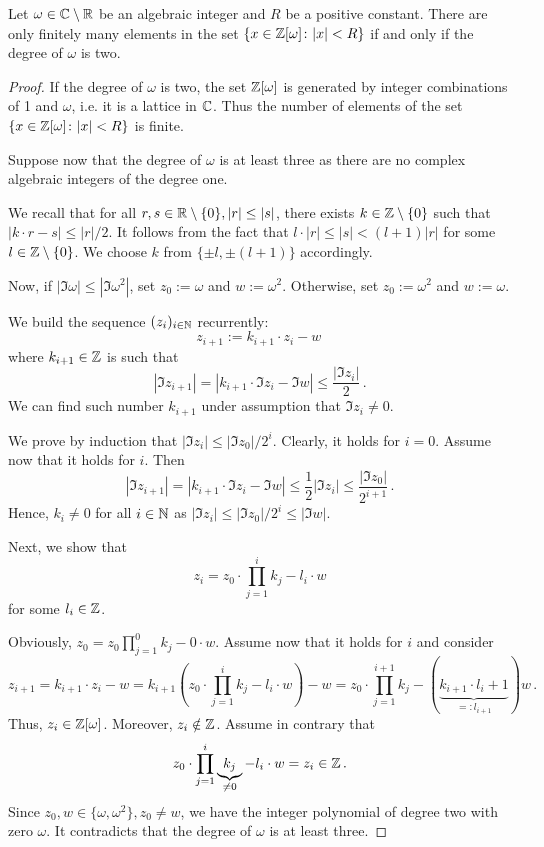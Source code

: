\begin{lem}
\label{lem:numElemCC}
Let $\omega\in \mathbb{C}\setminus\mathbb{R}$ be an algebraic integer and $R$ be a positive constant. There are only finitely many elements in the set $\left\{x \in\mathbb{Z}[\omega] \colon |x|<R\right\}$ if and only if the degree of $\omega$ is two.  
\end{lem}
\begin{proof}
If the degree of $\omega$ is two, the set $\mathbb{Z}[\omega]$ is generated by integer combinations of 1 and $\omega$, i.e. it is a lattice in $\mathbb{C}$. Thus the number of elements of the set $\left\{x \in\mathbb{Z}[\omega] \colon |x|<R\right\}$ is finite.

Suppose now that the degree of $\omega$ is at least three as there are no complex algebraic integers of the degree one. 


We recall that for all $r,s\in\mathbb{R}\setminus\{0\}, |r|\leq|s|$, there exists $k\in\mathbb{Z}\setminus\{0\}$ such that $|k\cdot r -s|\leq |r|/2$. It follows from the fact that $l\cdot |r| \leq |s| <(l+1)|r| $ for some $l\in\mathbb{Z}\setminus\{0\}$. We choose $k$ from $\{\pm l,\pm(l+1)\}$ accordingly. 
 
Now, if $|\Im \omega|\leq|\Im \omega^2|$, set $z_0:=\omega$ and $w:=\omega^2$. Otherwise, set $z_0:=\omega^2$ and $w:=\omega$.   

We build the sequence $(z_i)_{i\in\mathbb{N}}$ recurrently:
$$
z_{i+1}:=k_{i+1} \cdot z_{i}-w\, 
$$
where $k_{i+1}\in\mathbb{Z}$ is such that 
$$
|\Im z_{i+1}|=|k_{i+1} \cdot\Im z_{i}-\Im w|\leq \frac{|\Im z_{i}|}{2}\,.
$$
We can find such number $k_{i+1}$ under assumption that $\Im z_{i} \neq 0$.

We prove by induction that $|\Im z_i|\leq |\Im z_0|/2^i$. Clearly, it holds for $i=0$. Assume now that it holds for $i$. Then 
$$
|\Im z_{i+1}|= |k_{i+1} \cdot \Im z_{i}- \Im w|\leq \frac{1}{2}|\Im z_i|\leq \frac{|\Im z_0|}{2^{i+1}}\,. 
$$
Hence, $k_i\neq 0$ for all $i\in\mathbb{N}$ as $|\Im z_i|\leq |\Im z_0|/2^i \leq |\Im w|$.

Next, we show that
$$
z_i=z_0 \cdot \prod_{j=1}^i k_j- l_i\cdot w
$$
for some $l_i\in\mathbb{Z}$. 

Obviously, $z_0=z_0 \prod_{j=1}^0 k_j - 0\cdot w$. Assume now that it holds for $i$ and consider
$$
z_{i+1}=k_{i+1} \cdot z_{i}-w= k_{i+1}\left(z_0 \cdot \prod_{j=1}^i k_j- l_i\cdot w\right) -w=z_0 \cdot \prod_{j=1}^{i+1} k_j - (\underbrace{k_{i+1}\cdot l_i +1}_{=:l_{i+1}})w\,.
$$
Thus, $z_i\in\mathbb{Z}[\omega]$. Moreover, $z_i\notin \mathbb{Z}$. Assume in contrary that 
$$
z_0 \cdot \prod_{j=1}^i \underbrace{k_j}_{\neq0}- l_i\cdot w = z_i\in \mathbb{Z}\,.
$$
Since $z_0,w\in\{\omega, \omega^2\}, z_0\neq w$, we have the integer polynomial of degree two with zero $\omega$. It contradicts that the degree of $\omega$ is at least three.




\end{proof}
